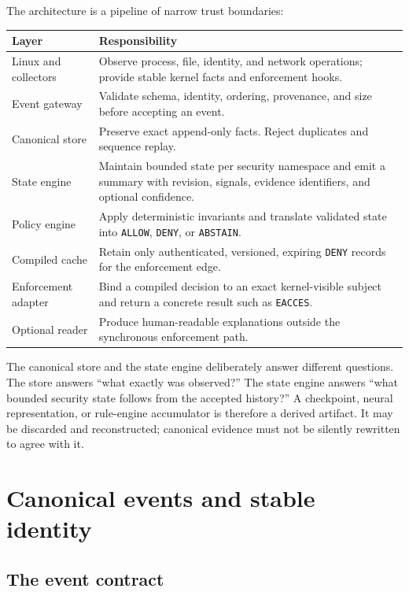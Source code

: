 \documentclass[11pt,a4paper]{article}
\begin{document}
The architecture is a pipeline of narrow trust boundaries:

\begin{center}
\begin{tabular}{>{\raggedright\arraybackslash}p{} >{\raggedright\arraybackslash}p{}}
\toprule
Layer & Responsibility \\
\midrule
Linux and collectors & Observe process, file, identity, and network operations; provide stable kernel facts and enforcement hooks. \\
Event gateway & Validate schema, identity, ordering, provenance, and size before accepting an event. \\
Canonical store & Preserve exact append-only facts. Reject duplicates and sequence replay. \\
State engine & Maintain bounded state per security namespace and emit a summary with revision, signals, evidence identifiers, and optional confidence. \\
Policy engine & Apply deterministic invariants and translate validated state into \texttt{ALLOW}, \texttt{DENY}, or \texttt{ABSTAIN}. \\
Compiled cache & Retain only authenticated, versioned, expiring \texttt{DENY} records for the enforcement edge. \\
Enforcement adapter & Bind a compiled decision to an exact kernel-visible subject and return a concrete result such as \texttt{EACCES}. \\
Optional reader & Produce human-readable explanations outside the synchronous enforcement path. \\
\bottomrule
\end{tabular}
\end{center}

The canonical store and the state engine deliberately answer different
questions. The store answers ``what exactly was observed?'' The state engine
answers ``what bounded security state follows from the accepted history?'' A
checkpoint, neural representation, or rule-engine accumulator is therefore a
derived artifact. It may be discarded and reconstructed; canonical evidence
must not be silently rewritten to agree with it.

\section{Canonical events and stable identity}

\subsection{The event contract}
\end{document}
